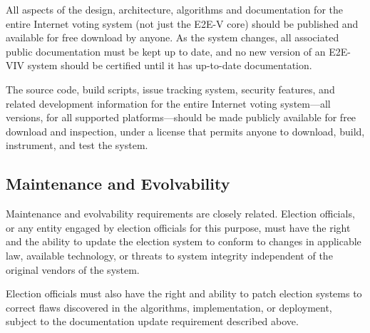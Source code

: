 All aspects of the design, architecture, algorithms and documentation
for the entire Internet voting system (not just the E2E-V core) should
be published and available for free download by anyone. As the system
changes, all associated public documentation must be kept up to date,
and no new version of an E2E-VIV system should be certified until it
has up-to-date documentation.

The source code, build scripts, issue tracking system, security
features, and related development information for the entire Internet
voting system---all versions, for all supported platforms---should be
made publicly available for free download and inspection, under a
license that permits anyone to download, build, instrument, and test
the system.

\subsection{Maintenance and Evolvability}

Maintenance and evolvability requirements are closely
related. Election officials, or any entity engaged by election
officials for this purpose, must have the right and the ability to
update the election system to conform to changes in applicable law,
available technology, or threats to system integrity independent of
the original vendors of the system. 

Election officials must also have the right and ability to patch
election systems to correct flaws discovered in the algorithms,
implementation, or deployment, subject to the documentation update
requirement described above.
